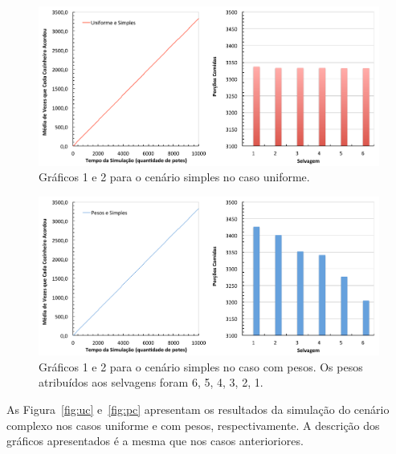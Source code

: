 \documentclass[11pt,a4paper]{article}
\begin{document}
\begin{figure}[htbp]
  \begin{center} 
    \includegraphics[scale=0.5]{uniforme_simples.pdf}
    \caption{Gráficos 1 e 2 para o cenário simples no caso uniforme.}
    \label{fig:us}
  \end{center}
\end{figure}
%
\begin{figure}[htbp]
  \begin{center}
    \includegraphics[scale=0.5]{pesos_simples.pdf}
    \caption{Gráficos 1 e 2 para o cenário simples no caso com pesos. Os pesos atribuídos aos 
    selvagens foram 6, 5, 4, 3, 2, 1.}
    \label{fig:ps}
  \end{center}
\end{figure}

As Figura~\ref{fig:uc} e~\ref{fig:pc} apresentam os resultados da simulação do cenário complexo nos 
casos uniforme e com pesos, respectivamente. A descrição dos gráficos apresentados é a mesma que nos 
casos anterioriores.
\end{document}
